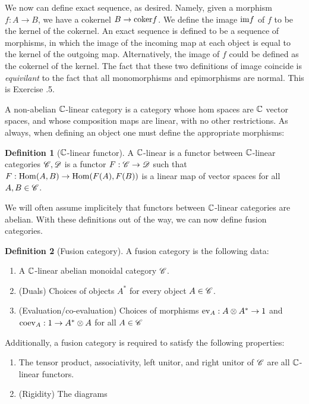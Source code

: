 \documentclass{article}
\theoremstyle{definition}
\newtheorem*{definition}{Definition}
\numberwithin{figure}{section}
\begin{document}
\begin{enumerate}[\thesection .1.]
We now can define exact sequence, as desired. Namely, given a morphism $f:A\to B$, we have a cokernel $B\to \mathrm{coker} f$. We define the image $\mathrm{im} f$ of $f$ to be the kernel of the cokernel. An exact sequence is defined to be a sequence of morphisms, in which the image of the incoming map at each object is equal to the kernel of the outgoing map. Alternatively, the image of $f$ could be defined as the cokernel of the kernel. The fact that these two definitions of image coincide is \textit{equivilant} to the fact that all monomorphisms and epimorphisms are normal. This is Exercise \thesection.5.

A non-abelian $\mathbb{C}$-linear category is a category whose hom spaces are $\mathbb{C}$ vector spaces, and whose composition maps are linear, with no other restrictions. As always, when defining an object one must define the appropriate morphisms:

\begin{definition}[$\mathbb{C}$-linear functor] A $\mathbb{C}$-linear is a functor between $\mathbb{C}$-linear categories $\mathscr{C},\mathscr{D}$ is a functor $F:\mathscr{C}\to\mathscr{D}$ such that $F:\mathrm{Hom}(A,B)\to \mathrm{Hom}(F(A),F(B))$ is a linear map of vector spaces for all $A,B\in \mathscr{C}$.
\end{definition}

We will often assume implicitely that functors between $\mathbb{C}$-linear categories are abelian. With these definitions out of the way, we can now define fusion categories.

\begin{definition}[Fusion category]  A fusion category is the following data:

\begin{enumerate}
\item A $\mathbb{C}$-linear abelian monoidal category $\mathscr{C}$.
\item (Duals) Choices of objects $A^*$ for every object $A\in \mathscr{C}$.
\item (Evaluation/co-evaluation) Choices of morphisms $\mathrm{ev}_A: A\otimes A^*\to 1$ and $\mathrm{coev}_A: 1\to A^*\otimes A$ for all $A\in \mathscr{C}$
\end{enumerate}

Additionally, a fusion category is required to satisfy the following properties:

\begin{enumerate}
\item The tensor product, associativity, left unitor, and right unitor of $\mathscr{C}$ are all $\mathbb{C}$-linear functors.
\item (Rigidity) The diagrams


\end{enumerate}
\end{definition}
\end{enumerate}
\end{document}
